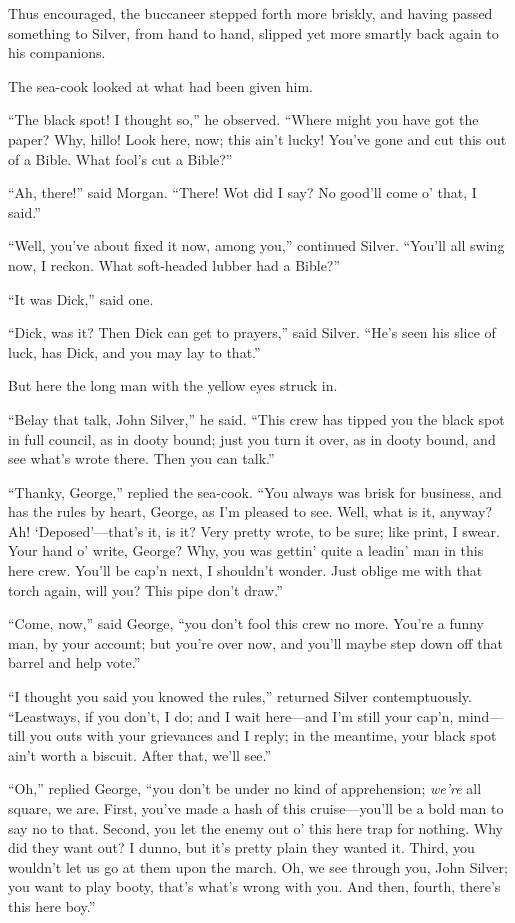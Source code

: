Thus encouraged, the buccaneer stepped forth more briskly, and having passed something to Silver, from hand to hand, slipped yet more smartly back again to his companions.

The sea-cook looked at what had been given him.

\enquote{The black spot! I thought so,} he observed. \enquote{Where might you have got the paper? Why, hillo! Look here, now; this ain’t lucky! You’ve gone and cut this out of a Bible. What fool’s cut a Bible?}

\enquote{Ah, there!} said Morgan. \enquote{There! Wot did I say? No good’ll come o’ that, I said.}

\enquote{Well, you’ve about fixed it now, among you,} continued Silver. \enquote{You’ll all swing now, I reckon. What soft-headed lubber had a Bible?}

\enquote{It was Dick,} said one.

\enquote{Dick, was it? Then Dick can get to prayers,} said Silver. \enquote{He’s seen his slice of luck, has Dick, and you may lay to that.}

But here the long man with the yellow eyes struck in.

\enquote{Belay that talk, John Silver,} he said. \enquote{This crew has tipped you the black spot in full council, as in dooty bound; just you turn it over, as in dooty bound, and see what’s wrote there. Then you can talk.}

\enquote{Thanky, George,} replied the sea-cook. \enquote{You always was brisk for business, and has the rules by heart, George, as I’m pleased to see. Well, what is it, anyway? Ah! ‘Deposed’---that’s it, is it? Very pretty wrote, to be sure; like print, I swear. Your hand o’ write, George? Why, you was gettin’ quite a leadin’ man in this here crew. You’ll be cap’n next, I shouldn’t wonder. Just oblige me with that torch again, will you? This pipe don’t draw.}

\enquote{Come, now,} said George, \enquote{you don’t fool this crew no more. You’re a funny man, by your account; but you’re over now, and you’ll maybe step down off that barrel and help vote.}

\enquote{I thought you said you knowed the rules,} returned Silver contemptuously. \enquote{Leastways, if you don’t, I do; and I wait here---and I’m still your cap’n, mind---till you outs with your grievances and I reply; in the meantime, your black spot ain’t worth a biscuit. After that, we’ll see.}

\enquote{Oh,} replied George, \enquote{you don’t be under no kind of apprehension; \textit{we’re} all square, we are. First, you’ve made a hash of this cruise---you’ll be a bold man to say no to that. Second, you let the enemy out o’ this here trap for nothing. Why did they want out? I dunno, but it’s pretty plain they wanted it. Third, you wouldn’t let us go at them upon the march. Oh, we see through you, John Silver; you want to play booty, that’s what’s wrong with you. And then, fourth, there’s this here boy.}

